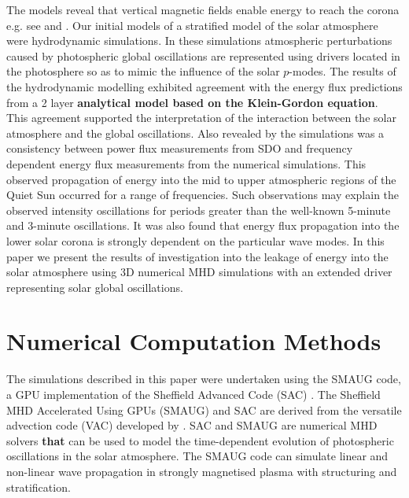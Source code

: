 \documentclass[physics,article,submit,pdftex,moreauthors]{Definitions/mdpi}
\begin{document}
The models reveal that vertical magnetic fields enable energy to reach the corona e.g. see  \citet{Khomenko2013} and  \citet{Santamaria2015}. Our initial models of a stratified model of the solar atmosphere \citet{Griffiths2018b} were hydrodynamic simulations. In these simulations atmospheric perturbations caused by photospheric global oscillations are represented using drivers located in the photosphere so as to mimic the influence of the solar $p$-modes. The results of the hydrodynamic modelling exhibited agreement  with the energy flux predictions from a 2 layer {\bf analytical model based on the Klein-Gordon equation}. This agreement supported the interpretation of the interaction between the solar atmosphere and the global oscillations. Also revealed by the simulations  was a consistency between power flux measurements from SDO and frequency dependent energy flux measurements from the numerical simulations. This observed propagation of energy into the mid to upper atmospheric regions of the Quiet Sun occurred for a range of frequencies. Such observations may explain the observed intensity oscillations for periods greater than the well-known 5-minute and 3-minute oscillations. It was also found that energy flux propagation into the lower solar corona is strongly dependent on the particular wave modes. In this paper we present the results of investigation into the leakage of energy into the solar atmosphere using 3D numerical MHD simulations with an extended driver representing solar global oscillations. 




\section{Numerical Computation Methods}


The simulations described in this paper were undertaken using the SMAUG code, a GPU implementation of the Sheffield Advanced Code (SAC) \citet{Shelyag2008}. The Sheffield MHD Accelerated Using GPUs (SMAUG) \citet{Griffiths2015} and SAC  are derived from the versatile advection code (VAC) developed by \citet{Toth1996}. SAC and SMAUG are numerical MHD solvers {\bf that} can be used to model the time-dependent evolution of photospheric oscillations in the solar atmosphere. The SMAUG code can simulate linear and non-linear wave propagation in strongly magnetised plasma with structuring and stratification.
\end{document}
